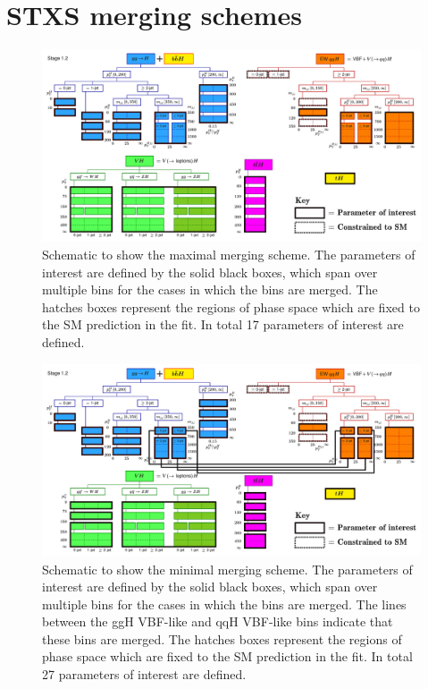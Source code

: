 \chapter{STXS merging schemes}\label{app:merging_schemes}

\begin{landscape}
\begin{figure}[htbp]
  \centering
  \includegraphics[width=1\linewidth]{Figures/app_merging_schemes/ms_maximal.pdf}
  \caption[Schematic of the maximal merging scheme]
  {
    Schematic to show the maximal merging scheme. The parameters of interest are defined by the solid black boxes, which span over multiple bins for the cases in which the bins are merged. The hatches boxes represent the regions of phase space which are fixed to the SM prediction in the fit. In total 17 parameters of interest are defined.
  }
  \label{fig:maximal_scheme}
\end{figure}
\end{landscape}

\begin{landscape}
\begin{figure}[htbp]
  \centering
  \includegraphics[width=1\linewidth]{Figures/app_merging_schemes/ms_minimal.pdf}
  \caption[Schematic of the minimal merging scheme]
  {
    Schematic to show the minimal merging scheme. The parameters of interest are defined by the solid black boxes, which span over multiple bins for the cases in which the bins are merged. The lines between the ggH VBF-like and qqH VBF-like bins indicate that these bins are merged. The hatches boxes represent the regions of phase space which are fixed to the SM prediction in the fit. In total 27 parameters of interest are defined.
  }
  \label{fig:minimal_scheme}
\end{figure}
\end{landscape}